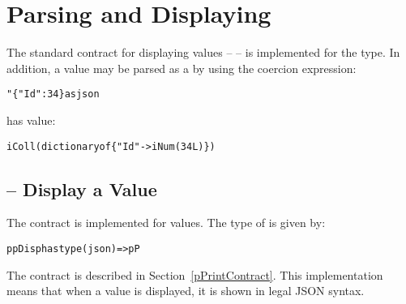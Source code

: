 \section{Parsing and Displaying}
The standard contract for displaying values --  -- is implemented for the  type. In addition, a  value may be parsed as a  by using the coercion expression:
\begin{alltt}
"\{"Id" : 34 \} as json
\end{alltt}
has value:
\begin{alltt}
iColl(dictionary of \{ "Id" -> iNum(34L) \})
\end{alltt}

\subsection{ -- Display a  Value}
The  contract is implemented for  values. The type of  is given by:
\begin{alltt}
ppDisp has type (json)=>pP
\end{alltt}
The  contract is described in Section~\vref{pPrintContract}. This implementation means that when a  value is displayed, it is shown in legal JSON syntax.

